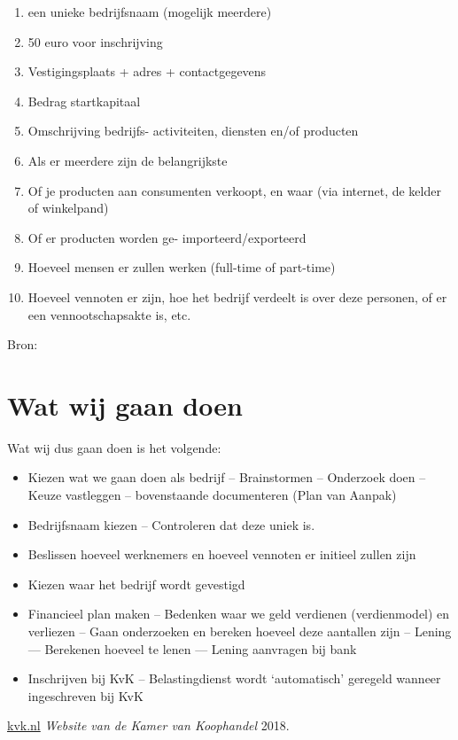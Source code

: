 \documentclass[11pt,oneside,a4paper,numbers=enddot]{report} %
\begin{document}
\begin{enumerate}

\item
  een unieke bedrijfsnaam (mogelijk meerdere)
\item
  50 euro voor inschrijving
\item
  Vestigingsplaats
  + adres
  + contactgegevens
\item
  Bedrag startkapitaal
\item
  Omschrijving bedrijfs- activiteiten,
  diensten en/of
  producten
\item
  Als er meerdere zijn de belangrijkste
\item
  Of je producten aan consumenten verkoopt,
  en waar
  (via internet,
  de kelder of winkelpand)
\item
  Of er producten worden ge- importeerd/exporteerd
\item
  Hoeveel mensen er zullen werken
  (full-time of part-time)
\item
  Hoeveel vennoten er zijn,
  hoe het bedrijf verdeelt is over deze personen,
  of er een vennootschapsakte is,
  etc.
  
\end{enumerate}

Bron: \cite{kvk}

\section{Wat wij gaan doen}

Wat wij dus gaan doen is het volgende:

\begin{itemize}
\item
  Kiezen wat we gaan doen als bedrijf
  -- Brainstormen
  -- Onderzoek doen
  -- Keuze vastleggen
  -- bovenstaande documenteren (Plan van Aanpak)
\item
  Bedrijfsnaam kiezen
  -- Controleren dat deze uniek is.
\item
  Beslissen hoeveel werknemers en
  hoeveel vennoten er initieel zullen zijn
\item
  Kiezen waar het bedrijf wordt gevestigd
\item
  Financieel plan maken
  -- Bedenken waar we geld verdienen (verdienmodel) en verliezen
  -- Gaan onderzoeken en bereken hoeveel deze aantallen zijn
  -- Lening
  --- Berekenen hoeveel te lenen
  --- Lening aanvragen bij bank
\item
  Inschrijven bij KvK -- Belastingdienst wordt `automatisch' geregeld
  wanneer ingeschreven bij KvK
\end{itemize}

\begin{thebibliography}{1}

 \href{https://www.kvk.nl}{kvk.nl} {\em Website van de Kamer van Koophandel}  2018.

\end{thebibliography}
\end{document}
